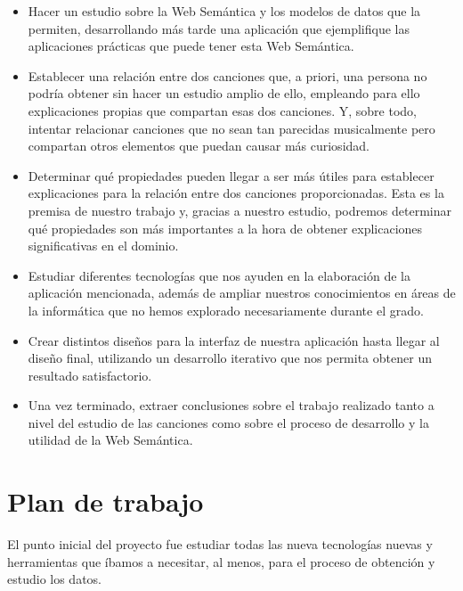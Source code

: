 \begin{itemize}
\item Hacer un estudio sobre la Web Semántica y los modelos de datos que la permiten, desarrollando más tarde una aplicación que ejemplifique las aplicaciones prácticas que puede tener esta Web Semántica.\\

\item Establecer una relación entre dos canciones que, a priori, una persona no podría obtener sin hacer un estudio amplio de ello, empleando para ello explicaciones propias que compartan esas dos canciones. Y, sobre todo, intentar relacionar canciones que no sean tan parecidas musicalmente pero compartan otros elementos que puedan causar más curiosidad.\\

\item Determinar qué propiedades pueden llegar a ser más útiles para establecer explicaciones para la relación entre dos canciones proporcionadas. Esta es la premisa de nuestro trabajo y, gracias a nuestro estudio, podremos determinar qué propiedades son más importantes a la hora de obtener explicaciones significativas en el dominio.\\

\item Estudiar diferentes tecnologías que nos ayuden en la elaboración de la aplicación mencionada, además de ampliar nuestros conocimientos en áreas de la informática que no hemos explorado necesariamente durante el grado.\\

\item Crear distintos diseños para la interfaz de nuestra aplicación hasta llegar al diseño final, utilizando un desarrollo iterativo que nos permita obtener un resultado satisfactorio.\\

\item Una vez terminado, extraer conclusiones sobre el trabajo realizado tanto a nivel del estudio de las canciones como sobre el proceso de desarrollo y la utilidad de la Web Semántica.\\
\end{itemize}


\section{Plan de trabajo}

El punto inicial del proyecto fue estudiar todas las nueva tecnologías nuevas y herramientas que íbamos a necesitar, al menos, para el proceso de obtención y estudio los datos.\\

